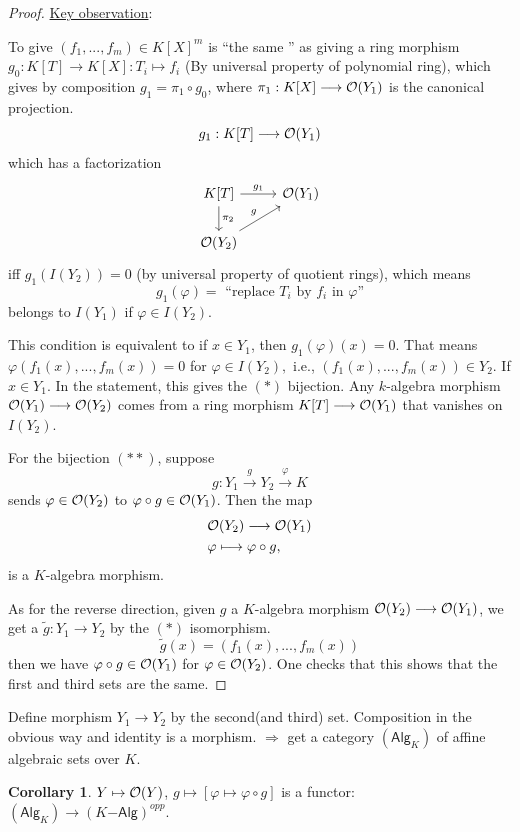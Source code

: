 \documentclass[11pt]{article}
\theoremstyle{definition}
\newtheorem{cor}[thm]{Corollary}
\newcommand{\calo}{{\cal O}}
\newcommand{\Lrta}{\Longrightarrow}
\newcommand{\lrta}{\longrightarrow}
\begin{document}
\begin{proof}
\underline{Key observation}:

To give $(f_1,...,f_m)\in K[X]^m$ is ``the same '' as giving a ring morphism $g_0:K[T]\lrta K[X]: T_i\mapsto f_i$ (By universal property of polynomial ring), which gives by composition $g_1=\pi_1\circ g_0$, where $\pi_1: K[X]\lrta \calo(Y_1)$ is the canonical projection.
$$
g_1: K[T]\lrta \calo(Y_1)
$$
which has a factorization
\[
\begin{tikzcd}
K[T] \arrow[r,"g_1"] \arrow[d,"\pi_2"]  & \calo(Y_1)  \\
   \calo(Y_2) \arrow[ur,"g"] & 
\end{tikzcd}
\]
iff $g_1(I(Y_2))=0$ (by universal property of quotient rings), which means 
$$
g_1(\varphi)=\text{ ``replace $T_i$ by $f_i$ in $\varphi$''}
$$
belongs to $I(Y_1)$ if $\varphi\in I(Y_2)$.

This condition is equivalent to if $x\in Y_1$, then $g_1(\varphi)(x)=0$. That means $\varphi(f_1(x),...,f_m(x))=0$ for $\varphi\in I(Y_2),$ i.e., $(f_1(x),...,f_m(x))\in Y_2$. If $x\in Y_1$. In the statement, this gives the $(*)$ bijection. Any $k$-algebra morphism $\calo(Y_1)\lrta\calo(Y_2)$  comes from a ring morphism $K[T]\lrta \calo(Y_1)$ that vanishes on $I(Y_2)$.


For the bijection $(**)$, suppose 
$$
g:Y_1\overset{g}{\lrta} Y_2\overset{\varphi}{\lrta} K
$$
sends $\varphi\in \calo(Y_2)$ to $\varphi\circ g\in\calo(Y_1)$. Then the map 
$$
\begin{aligned}
& \calo(Y_2)\lrta \calo(Y_1)\\
&\varphi\longmapsto \varphi\circ g,
\end{aligned}
$$
is a $K$-algebra morphism.

As for the reverse direction, given $g$ a $K$-algebra morphism $\calo(Y_2)\lrta \calo(Y_1)$, we get a $\tilde{g}:Y_1\lrta Y_2$ by the $(*)$ isomorphism.
$$
\tilde{g}(x)=(f_1(x),...,f_m(x))
$$
then we have $\varphi\circ g\in\calo(Y_1)$ for $\varphi\in \calo(Y_2)$. One checks that this shows that the first and third sets are the same.
\end{proof}

Define morphism $Y_1\lrta Y_2$ by the second(and third) set.  Composition in the obvious way and identity is a morphism.
$\Lrta$ get a category $(\mathsf{Alg}_K)$ of affine algebraic sets over $K$.

\begin{cor}
$Y\mapsto \calo(Y)$, $g\mapsto [\varphi\mapsto \varphi\circ g]$ is a functor: $(\mathsf{Alg}_K)\lrta (K\mathsf{-Alg})^{opp}$.
\end{cor}
\end{document}
